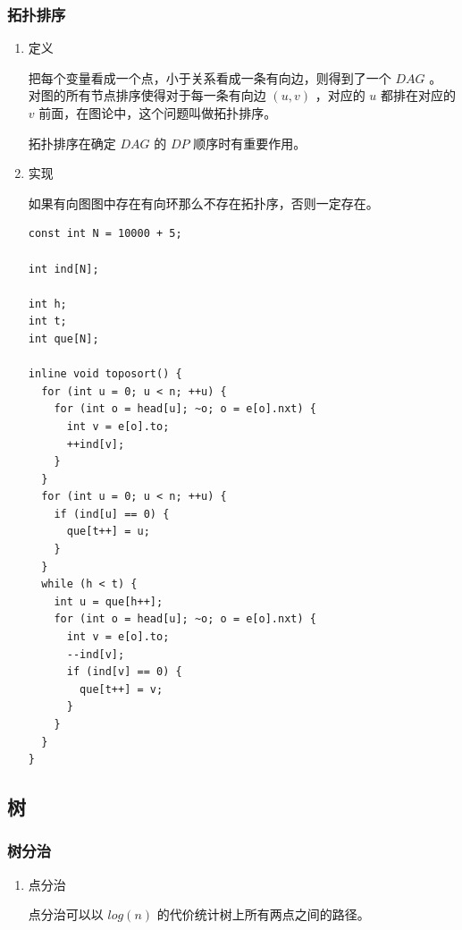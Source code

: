 \documentclass[11pt]{article}
\begin{document}
\subsubsection{拓扑排序}
\label{sec-6-4-2}

\begin{enumerate}
\item 定义
\label{sec-6-4-2-1}

把每个变量看成一个点，小于关系看成一条有向边，则得到了一个 $DAG$ 。 对图的所有节点排序使得对于每一条有向边 $(u,v)$ ，对应的 $u$ 都排在对应的 $v$ 前面，在图论中，这个问题叫做拓扑排序。

拓扑排序在确定 $DAG$ 的 $DP$ 顺序时有重要作用。

\item 实现
\label{sec-6-4-2-2}

如果有向图图中存在有向环那么不存在拓扑序，否则一定存在。

\begin{verbatim}
const int N = 10000 + 5;

int ind[N];

int h;
int t;
int que[N];

inline void toposort() {
  for (int u = 0; u < n; ++u) {
    for (int o = head[u]; ~o; o = e[o].nxt) {
      int v = e[o].to;
      ++ind[v];
    }
  }
  for (int u = 0; u < n; ++u) {
    if (ind[u] == 0) {
      que[t++] = u;
    }
  }
  while (h < t) {
    int u = que[h++];
    for (int o = head[u]; ~o; o = e[o].nxt) {
      int v = e[o].to;
      --ind[v];
      if (ind[v] == 0) {
        que[t++] = v;
      }
    }
  }
}
\end{verbatim}
\end{enumerate}
\subsection{树}
\label{sec-6-5}
\subsubsection{树分治}
\label{sec-6-5-1}
\begin{enumerate}
\item 点分治
\label{sec-6-5-1-1}

点分治可以以  $log(n)$ 的代价统计树上所有两点之间的路径。
\end{enumerate}
\end{document}
